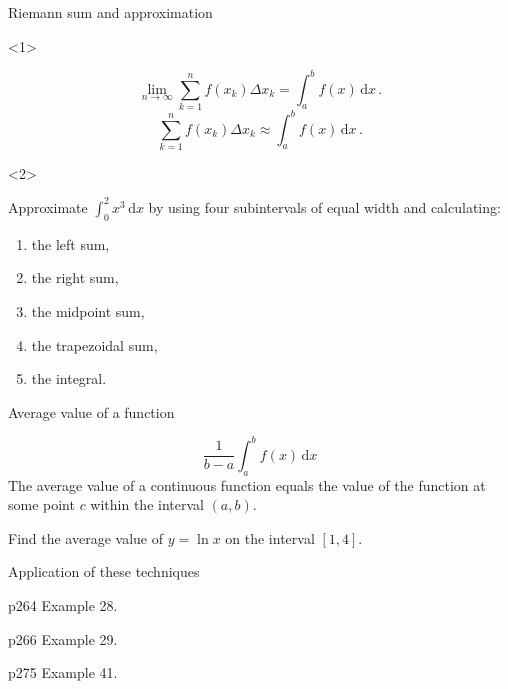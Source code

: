 \begin{frame}{Riemann sum and approximation}

\begin{onlyenv}<1>


\[
\lim_{n\to\infty}\sum_{k=1}^{n}f\left(x_{k}\right)\Delta x_{k}=\int_{a}^{b}f\left(x\right)\,\mathrm{d}x\,.
\]
\[
\sum_{k=1}^{n}f\left(x_{k}\right)\Delta x_{k}\approx\int_{a}^{b}f\left(x\right)\,\mathrm{d}x\,.
\]


\end{onlyenv}



\begin{onlyenv}<2>

\begin{example}
Approximate $\int_{0}^{2}x^{3}\,\mathrm{d}x$ by using four subintervals
of equal width and calculating:
\begin{enumerate}
\item the left sum,
\item the right sum,
\item the midpoint sum,
\item the trapezoidal sum,
\item the integral.
\end{enumerate}

\end{example}

\end{onlyenv}

\end{frame}

\begin{frame}{Average value of a function}


\[
\frac{1}{b-a}\int_{a}^{b}f\left(x\right)\,\mathrm{d}x
\]
The average value of a \alert{continuous} function equals the value
of the function at some point $c$ within the interval $\left(a,b\right)$.
\begin{example}
Find the average value of $y=\ln x$ on the interval $\left[1,4\right]$.
\end{example}

\end{frame}

\begin{frame}{Application of these techniques}

\begin{example}
p264 Example 28.
\end{example}



\begin{example}
p266 Example 29.
\end{example}



\begin{example}
p275 Example 41.
\end{example}

\end{frame}



